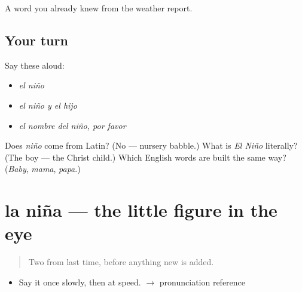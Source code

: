 \begin{grammarlens}[title={What you've built}]
A word you already knew from the weather report.
\end{grammarlens}

\subsection*{Your turn}
Say these aloud:

\begin{itemize}
\raggedright
  \item \emph{el niño}
  \item \emph{el niño y el hijo}
  \item \emph{el nombre del niño, por favor}
\end{itemize}

\begin{tcolorbox}[breakable,colback=teal!4,colframe=teal!35!black,title={Before you move on}]
Does \emph{niño} come from Latin? (No --- nursery babble.) What is \emph{El Niño} literally? (The boy --- the Christ child.) Which English words are built the same way? (\emph{Baby}, \emph{mama}, \emph{papa}.)
\end{tcolorbox}
\section[la niña]{la niña --- the little figure in the eye}

\label{lesson:ES-C308-nina}



\begin{quote}
Two from last time, before anything new is added.
\end{quote}

\begin{sounds}
\begin{itemize}
\raggedright
  \item Say it once slowly, then at speed. $\to$ pronunciation reference
\end{itemize}
\end{sounds}

